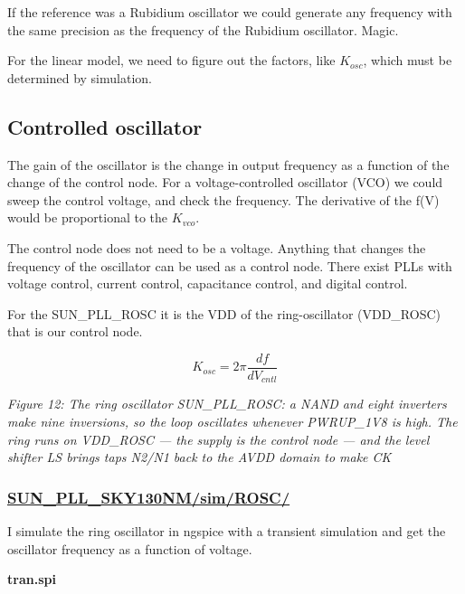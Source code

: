 If the reference was a Rubidium oscillator we could generate any
frequency with the same precision as the frequency of the Rubidium
oscillator. Magic.

For the linear model, we need to figure out the factors, like
\(K_{osc}\), which must be determined by simulation.

\subsection{Controlled oscillator}\label{controlled-oscillator}

The gain of the oscillator is the change in output frequency as a
function of the change of the control node. For a voltage-controlled
oscillator (VCO) we could sweep the control voltage, and check the
frequency. The derivative of the f(V) would be proportional to the
\(K_{vco}\).

The control node does not need to be a voltage. Anything that changes
the frequency of the oscillator can be used as a control node. There
exist PLLs with voltage control, current control, capacitance control,
and digital control.

For the SUN\_PLL\_ROSC it is the VDD of the ring-oscillator (VDD\_ROSC)
that is our control node.

\[K_{osc} = 2 \pi\frac{ df}{dV_{cntl}}\]


{
\centering
{}
}

\emph{Figure 12: The ring oscillator SUN\_PLL\_ROSC: a NAND and eight
inverters make nine inversions, so the loop oscillates whenever
PWRUP\_1V8 is high. The ring runs on VDD\_ROSC --- the supply is the
control node --- and the level shifter LS brings taps N2/N1 back to the
AVDD domain to make CK}

\subsubsection{\texorpdfstring{\href{https://github.com/wulffern/sun_pll_sky130nm/tree/main/sim/ROSC}{SUN\_PLL\_SKY130NM/sim/ROSC/}}{SUN\_PLL\_SKY130NM/sim/ROSC/}}\label{sun_pll_sky130nmsimrosc}

I simulate the ring oscillator in ngspice with a transient simulation
and get the oscillator frequency as a function of voltage.

\textbf{tran.spi}

\begin{Shaded}
\begin{Highlighting}[]
\end{Highlighting}
\end{Shaded}

